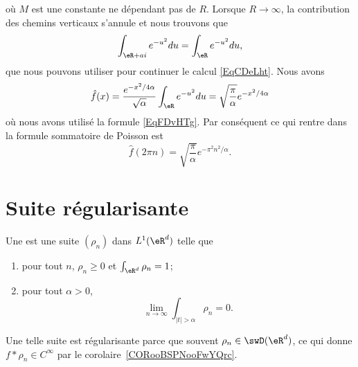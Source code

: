 \begin{example}
	où \( M\) est une constante ne dépendant pas de \( R\). Lorsque \( R\to \infty\), la contribution des chemins verticaux s'annule et nous trouvons que
	\begin{equation}    \label{EqjrNxLr}
		\int_{\eR+ai} e^{-u^2}du=\int_{\eR} e^{-u^2}du,
	\end{equation}
	que nous pouvons utiliser pour continuer le calcul \eqref{EqCDeLht}. Nous avons
	\begin{equation}
		\hat f(x)= \frac{ e^{-x^2/4\alpha}}{\sqrt{\alpha}}\int_{\eR} e^{-u^2}du\\
		=\sqrt{\frac{ \pi }{ \alpha }} e^{-x^2/4\alpha}
	\end{equation}
	où nous avons utilisé la formule \eqref{EqFDvHTg}. Par conséquent ce qui rentre dans la formule sommatoire de Poisson est
	\begin{equation}
		\hat f(2\pi n)=\sqrt{\frac{ \pi }{ \alpha }} e^{-\pi^2 n^2/\alpha}.
	\end{equation}
\end{example}

\section{Suite régularisante}

\begin{definition}      \label{DEFooRIFYooUUUoha}
	Une  est une suite \( (\rho_n)\) dans \( L^1(\eR^d)\) telle que
	\begin{enumerate}
		\item       \label{ITEMooEYXYooAkKeXX}
		      pour tout \( n\), \( \rho_n\geq 0\) et \( \int_{\eR^d}\rho_n=1\);
		\item
		      pour tout \( \alpha>0\),
		      \begin{equation}
			      \lim_{n\to \infty} \int_{| t |>\alpha}\rho_n=0.
		      \end{equation}
	\end{enumerate}
\end{definition}
Une telle suite est régularisante parce que souvent \( \rho_n\in\swD(\eR^d)\), ce qui donne \( f*\rho_n\in C^{\infty}\) par le corolaire~\ref{CORooBSPNooFwYQrc}.

